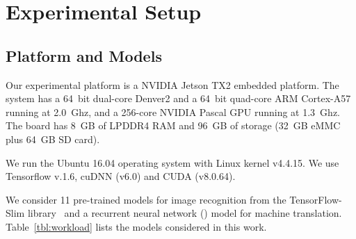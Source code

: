 \section{Experimental Setup \label{sec:setup}}
\subsection{Platform and Models\label{sec:platform}}
 Our experimental platform is a NVIDIA Jetson TX2 embedded platform. The system has a 64~bit dual-core Denver2 and a
64~bit quad-core ARM Cortex-A57 running at 2.0~Ghz, and a 256-core NVIDIA Pascal GPU running at 1.3~Ghz. The board has 8~GB of LPDDR4 RAM
and 96~GB of storage (32~GB eMMC plus 64~GB SD card).


 We run the Ubuntu 16.04 operating system with Linux kernel v4.4.15. We use Tensorflow v.1.6, cuDNN (v6.0) and
CUDA (v8.0.64).


 We consider 11 pre-trained \CNN models for image recognition from the TensorFlow-Slim library~\cite{silberman2013tensorflow} and a recurrent neural network (\RNN) model for machine translation. Table~\ref{tbl:workload} lists the models considered in this work.



